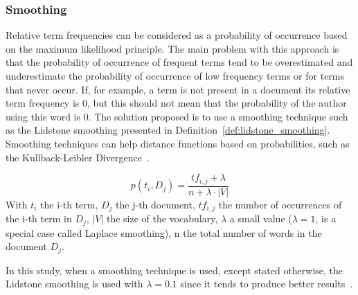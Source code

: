 \subsubsection{Smoothing}

Relative term frequencies can be considered as a probability of occurrence based on the maximum likelihood principle.
The main problem with this approach is that the probability of occurrence of frequent terms tend to be overestimated and underestimate the probability of occurrence of low frequency terms or for terms that never occur.
If, for example, a term is not present in a document its relative term frequency is 0, but this should not mean that the probability of the author using this word is 0.
The solution proposed is to use a smoothing technique such as the Lidstone smoothing presented in Definition~\ref{def:lidstone_smoothing}.
Smoothing techniques can help distance functions based on probabilities, such as the Kullback-Leibler Divergence~\cite{savoy_stylo}.

\begin{definition}
  \label{def:lidstone_smoothing}
  \begin{equation}
    p(t_i, D_j) = \frac{tf_{i,j} + \lambda}{n + \lambda \cdot |V|}
  \end{equation}
  With $t_i$ the i-th term, $D_j$ the j-th document, $tf_{i,j}$ the number of occurrences of the i-th term in $D_j$, $|V|$ the size of the vocabulary, $\lambda$ a small value ($\lambda = 1$, is a special case called Laplace smoothing), n the total number of words in the document $D_j$.
\end{definition}

In this study, when a smoothing technique is used, except stated otherwise, the Lidstone smoothing is used with $\lambda = 0.1$ since it tends to produce better results~\cite{savoy_stylo}.
